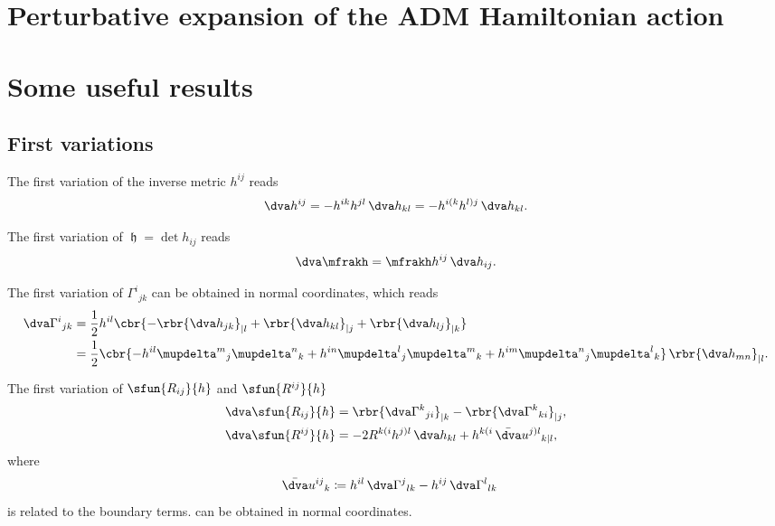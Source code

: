 \documentclass[a4paper,11pt]{article}
\begin{document}
\section{Perturbative expansion of the ADM Hamiltonian action}


\appendix

\section*{Some useful results}

\subsection*{First variations}

The first variation of the inverse metric $h^{ij}$ reads
\begin{align}
\dva h^{ij} = -h^{ik}h^{jl}\,\dva h_{kl} = - h^{i(k}h^{l)j}\,\dva h_{kl}.
\end{align}

The first variation of $\mfrakh = \det h_{ij}$ reads
\begin{align}
\dva \mfrakh = \mfrakh h^{ij}\,\dva h_{ij}.
\end{align}

The first variation of $\Gamma^i{}_{jk}$ can be obtained in normal coordinates,
which reads
\begin{align}
\dva \Gamma^{i}{}_{jk} &= \frac{1}{2} h^{il}
\cbr{-\rbr{\dva h_{jk}}_{|l} + \rbr{\dva h_{kl}}_{|j} + \rbr{\dva h_{lj}}_{|k}}
\\
&= \frac{1}{2} \cbr{-h^{il}\mupdelta^m{}_j\mupdelta^n{}_k
+h^{in}\mupdelta^l{}_j\mupdelta^m{}_k
+h^{im}\mupdelta^n{}_j\mupdelta^l{}_k}\,\rbr{\dva h_{mn}}_{|l}.
\end{align}

The first variation of $\sfun{R_{ij}}{h}$ and $\sfun{R^{ij}}{h}$
\begin{align}
\dva \sfun{R_{ij}}{h} &=
\rbr{\dva\Gamma^k{}_{ji}}_{|k} - \rbr{\dva\Gamma^k{}_{ki}}_{|j},
\label{eq:var-R_{ij}}
\\
\dva \sfun{R^{ij}}{h} &=
-2R^{k(i}h^{j)l}\,\dva h_{kl} + h^{k(i}\,\bar{\dva}u^{j)l}{}_{k|l},
\label{eq:var-Rijhu}
\end{align}
where
\begin{align}
\bar{\dva}u^{ij}{}_{k} &\coloneqq
h^{il}\,\dva\Gamma^{j}{}_{lk} - h^{ij}\,\dva\Gamma^{l}{}_{lk}
\end{align}
is related to the boundary terms.  can be obtained in 
normal 
coordinates.
\end{document}
